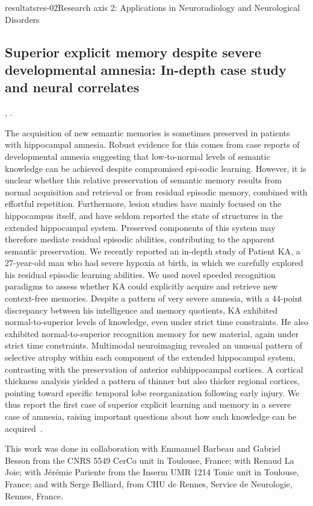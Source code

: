 \documentclass{ra2018}
\begin{document}
\begin{module}{resultats}{res-02}{Research axis 2: Applications in Neuroradiology and Neurological Disorders}
\subsection{Superior explicit memory despite severe developmental amnesia: In-depth case study and neural correlates}
\begin{participants}
      ,
      .
\end{participants}
The acquisition of new semantic memories is sometimes preserved in patients with hippocampal amnesia. Robust evidence for this comes from case reports of developmental amnesia suggesting that low-to-normal levels of semantic knowledge can be achieved despite compromised epi-sodic learning. However, it is unclear whether this relative preservation of semantic memory results from normal acquisition and retrieval or from residual episodic memory, combined with effortful repetition. Furthermore, lesion studies have mainly focused on the hippocampus itself, and have seldom reported the state of structures in the extended hippocampal system. Preserved components of this system may therefore mediate residual episodic abilities, contributing to the apparent semantic preservation. We recently reported an in-depth study of Patient KA, a 27-year-old man who had severe hypoxia at birth, in which we carefully explored his residual episodic learning abilities. We used novel speeded recognition paradigms to assess whether KA could explicitly acquire and retrieve new context-free memories. Despite a pattern of very severe amnesia, with a 44-point discrepancy between his intelligence and memory quotients, KA exhibited normal-to-superior levels of knowledge, even under strict time constraints. He also exhibited normal-to-superior recognition memory for new material, again under strict time constraints. Multimodal neuroimaging revealed an unusual pattern of selective atrophy within each component of the extended hippocampal system, contrasting with the preservation of anterior subhippocampal cortices. A cortical thickness analysis yielded a pattern of thinner but also thicker regional cortices, pointing toward specific temporal lobe reorganization following early injury. We thus report the first case of superior explicit learning and memory in a severe case of amnesia, raising important questions about how such knowledge can be acquired~\cite{jonin:inserm-01916086}.

This work was done in collaboration with Emmanuel Barbeau and Gabriel Besson from the CNRS 5549 CerCo unit in Toulouse, France; with Renaud La Joie; with Jérémie Pariente from the Inserm UMR 1214 Tonic unit in Toulouse, France; and with Serge Belliard, from CHU de Rennes, Service de Neurologie, Rennes, France.


\end{module}
\end{document}
